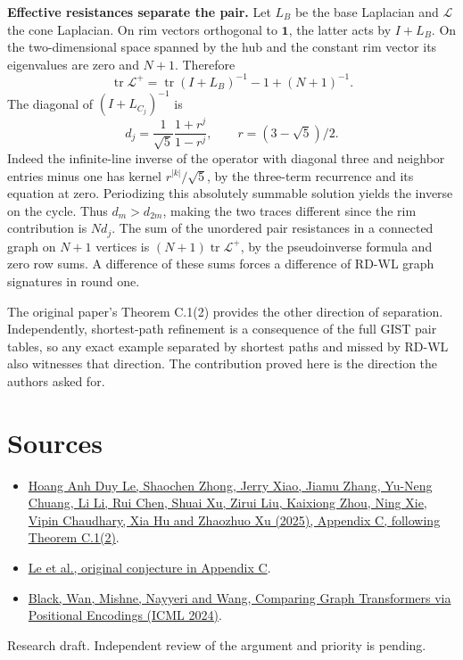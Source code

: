 \documentclass[11pt]{article}
\begin{document}
\textbf{Effective resistances separate the pair.} Let $L_B$ be the base Laplacian and $\mathcal L$ the cone Laplacian. On rim vectors orthogonal to $\mathbf1$, the latter acts by $I+L_B$. On the two-dimensional space spanned by the hub and the constant rim vector its eigenvalues are zero and $N+1$. Therefore
\[
 \operatorname{tr}\mathcal L^+=\operatorname{tr}(I+L_B)^{-1}-1+(N+1)^{-1}.
\]
The diagonal of $(I+L_{C_j})^{-1}$ is
\[
 d_j=\frac{1}{\sqrt5}\frac{1+r^j}{1-r^j},\qquad r=(3-\sqrt5)/2.
\]
Indeed the infinite-line inverse of the operator with diagonal three and neighbor entries minus one has kernel $r^{|k|}/\sqrt5$, by the three-term recurrence and its equation at zero. Periodizing this absolutely summable solution yields the inverse on the cycle. Thus $d_m>d_{2m}$, making the two traces different since the rim contribution is $Nd_j$. The sum of the unordered pair resistances in a connected graph on $N+1$ vertices is $(N+1)\operatorname{tr}\mathcal L^+$, by the pseudoinverse formula and zero row sums. A difference of these sums forces a difference of RD-WL graph signatures in round one.

The original paper's Theorem C.1(2) provides the other direction of separation. Independently, shortest-path refinement is a consequence of the full GIST pair tables, so any exact example separated by shortest paths and missed by RD-WL also witnesses that direction. The contribution proved here is the direction the authors asked for.

\section*{Sources}
\begin{itemize}\setlength{\itemsep}{0pt}\setlength{\parskip}{0pt}
\item \href{https://openreview.net/forum?id=CyXPiK5JLy}{Hoang Anh Duy Le, Shaochen Zhong, Jerry Xiao, Jiamu Zhang, Yu-Neng Chuang, Li Li, Rui Chen, Shuai Xu, Zirui Liu, Kaixiong Zhou, Ning Xie, Vipin Chaudhary, Xia Hu and Zhaozhuo Xu (2025), Appendix C, following Theorem C.1(2)}.
\item \href{https://openreview.net/pdf/4f1ece2425a5229a909606118c9c0b881326687c.pdf}{Le et al., original conjecture in Appendix C}.
\item \href{https://proceedings.mlr.press/v235/black24b.html}{Black, Wan, Mishne, Nayyeri and Wang, Comparing Graph Transformers via Positional Encodings (ICML 2024)}.
\end{itemize}
{\small Research draft. Independent review of the argument and priority is pending.}
\end{document}
